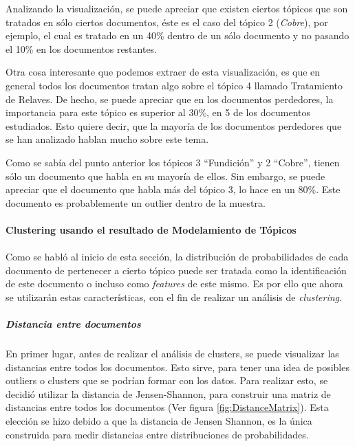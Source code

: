     Analizando la visualización, se puede apreciar que existen ciertos tópicos que son tratados en sólo ciertos documentos, éste es el caso del tópico 2 (\textit{Cobre}), por ejemplo, el cual es tratado en un 40\% dentro de un sólo documento y no pasando el 10\% en los documentos restantes.

    Otra cosa interesante que podemos extraer de esta visualización, es que en general todos los documentos tratan algo sobre el tópico 4 llamado Tratamiento de Relaves. De hecho, se puede apreciar que en los documentos perdedores, la importancia para este tópico es superior al 30\%, en 5 de los documentos estudiados. Esto quiere decir, que la mayoría de los documentos perdedores que se han analizado hablan mucho sobre este tema.
    
    Como se sabía del punto anterior los tópicos 3 ``Fundición'' y 2 ``Cobre'', tienen sólo un documento que habla en su mayoría de ellos. Sin embargo, se puede apreciar que el documento que habla más del tópico 3, lo hace en un 80\%. Este documento es probablemente un outlier dentro de la muestra.
    
\paragraph{Clustering usando el resultado de Modelamiento de Tópicos}
\paragraph*{}
    Como se habló al inicio de esta sección, la distribución de probabilidades de cada documento de pertenecer a cierto tópico puede ser tratada como la identificación de este documento o incluso como \textit{features} de este mismo. Es por ello que ahora se utilizarán estas características, con el fin de realizar un análisis de \textit{clustering}.
    
\subparagraph{Distancia entre documentos}
\subparagraph*{}
    En primer lugar, antes de realizar el análisis de clusters, se puede visualizar las distancias entre todos los documentos. Esto sirve, para tener una idea de posibles outliers o clusters que se podrían formar con los datos. Para realizar esto, se decidió utilizar la distancia de Jensen-Shannon, para construir una matriz de distancias entre todos los documentos (Ver figura \ref{fig:DistanceMatrix}). Esta elección se hizo debido a que la distancia de Jensen Shannon, es la única construida para medir distancias entre distribuciones de probabilidades.
    
